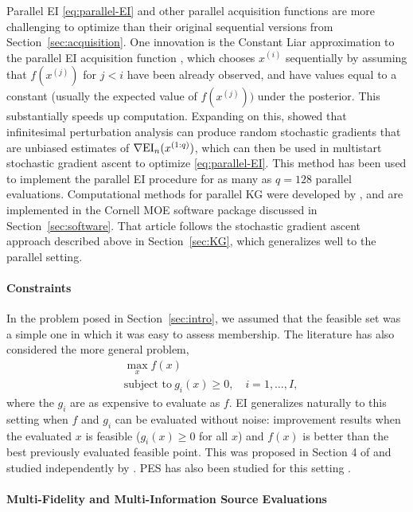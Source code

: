 \documentclass{article}
\begin{document}
Parallel EI \eqref{eq:parallel-EI} and other parallel acquisition functions are more challenging to optimize than their original sequential versions from Section~\ref{sec:acquisition}.  One innovation is the Constant Liar approximation to the parallel EI acquisition function \citep{GiLeCa10}, which chooses $x^{(i)}$ sequentially by assuming that $f(x^{(j)})$ for $j<i$ have been already observed, and have values equal to a constant (usually the expected value of $f(x^{(j)}))$ under the posterior.  This substantially speeds up computation.  
Expanding on this, \cite{wang2016parallel} showed that infinitesimal perturbation analysis can produce random stochastic gradients that are unbiased estimates of $\nabla \mathrm{EI}_n(x^{(1:q)})$, which can then be used in multistart stochastic gradient ascent to optimize \eqref{eq:parallel-EI}.  This method has been used to implement the parallel EI procedure for as many as $q=128$ parallel evaluations.
Computational methods for parallel KG were developed by \cite{wu2016parallel}, and are implemented in the Cornell MOE software package discussed in Section~\ref{sec:software}.  That article follows the stochastic gradient ascent approach described above in Section~\ref{sec:KG}, which generalizes well to the parallel setting.

\paragraph{Constraints}
In the problem posed in Section~\ref{sec:intro}, we assumed that the feasible set was a simple one in which it was easy to assess membership.  The literature has also considered the more general problem,
\begin{align*}
&\max_x f(x) \\
&\text{subject to}\ g_i(x) \ge 0, \quad i=1,\ldots,I,
\end{align*}
where the $g_i$ are as expensive to evaluate as $f$.  EI generalizes naturally to this setting when $f$ and $g_i$ can be evaluated without noise: improvement results when the evaluated $x$ is feasible ($g_i(x) \ge 0$ for all $x$) and $f(x)$ is better than the best previously evaluated feasible point.  
This was proposed in Section 4 of \cite{schonlau1998global}
and studied independently by \cite{gardner2014bayesian}.
PES has also been studied for this setting \citep{hernandez2015predictive}.

\paragraph{Multi-Fidelity and Multi-Information Source Evaluations}
\nocite{poloczek2017multi}
\end{document}
